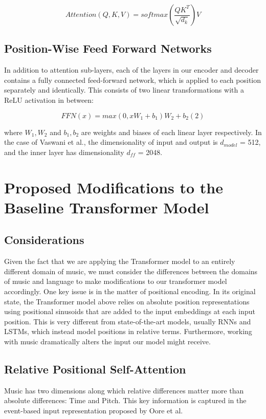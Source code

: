 \documentclass[../main.tex]{subfiles}
\begin{document}
{\large
\[
\label{eq:1.3}
Attention (Q,K,V) = softmax(\frac {QK^T} {\sqrt{d_k}})V 
\tag{1.3}
\]}

\subsection{Position-Wise Feed Forward Networks}
In addition to attention sub-layers, each of the layers in our encoder and decoder contains a fully connected feed-forward network, which is applied to each position separately and identically. This consists of two linear transformations with a ReLU activation in between:

\[ FFN(x) = max(0, xW_1 + b_1 )W_2 + b_2 (2) \]

where $W_1, W_2$ and $b_1, b_2$ are weights and biases of each linear layer respectively. In the case of Vaswani et al., the dimensionality of input and output is $d_{model}$ = 512, and the inner layer has dimensionality $d_{ff}$ = 2048.

\newpage
\section{Proposed Modifications to the Baseline Transformer Model}

\subsection{Considerations}
Given the fact that we are applying the Transformer model to an entirely different domain of music, we must consider the differences between the domains of music and language to make modifications to our transformer model accordingly. One key issue is in the matter of positional encoding. In its original state, the Transformer model above relies on absolute position representations using positional sinusoids that are added to the input embeddings at each input position. This is very different from state-of-the-art models, usually RNNs and LSTMs, which instead model positions in relative terms. %
Furthermore, working with music dramatically alters the input our model might receive. 

\newpage
\subsection{Relative Positional Self-Attention}
Music has two dimensions along which relative differences matter more than absolute differences: Time and Pitch. This key information is captured in the event-based input representation proposed by Oore et al. 
\end{document}
